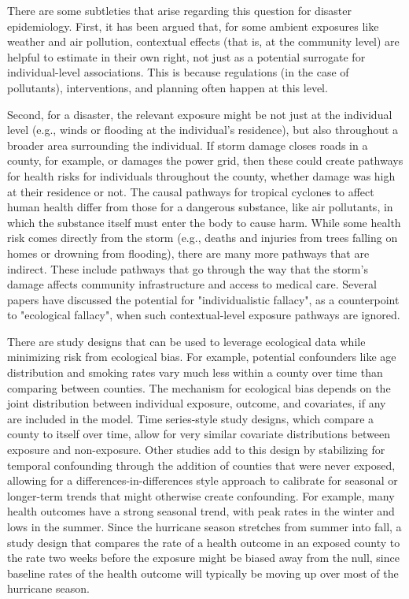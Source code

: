 There are some subtleties that arise regarding this question for disaster
epidemiology. First, it has been argued that, for some ambient exposures
like weather and air pollution, contextual effects (that is, at the community
level) are helpful to estimate in their own right, not just as a potential 
surrogate for individual-level associations. This is because regulations
(in the case of pollutants), interventions, and planning often happen at
this level. 

Second, for a disaster, the relevant exposure might be not just at the
individual level (e.g., winds or flooding at the individual's residence), but
also throughout a broader area surrounding the individual. If storm damage
closes roads in a county, for example, or damages the power grid, then these
could create pathways for health risks for individuals throughout the county,
whether damage was high at their residence or not. The causal pathways for
tropical cyclones to affect human health differ from those for a dangerous
substance, like air pollutants, in which the substance itself must enter the
body to cause harm. While some health risk comes directly from the storm (e.g.,
deaths and injuries from trees falling on homes or drowning from flooding),
there are many more pathways that are indirect. These include pathways that go
through the way that the storm's damage affects community infrastructure and
access to medical care. Several papers have discussed the potential for 
"individualistic fallacy", as a counterpoint to "ecological fallacy", when 
such contextual-level exposure pathways are ignored. 

There are study designs that can be used to leverage ecological data while
minimizing risk from ecological bias. For example, potential confounders like
age distribution and smoking rates vary much less within a county over time than
comparing between counties. The mechanism for ecological bias depends on the
joint distribution between individual exposure, outcome, and covariates, if any
are included in the model. Time series-style study designs, which compare a
county to itself over time, allow for very similar covariate distributions
between exposure and non-exposure. Other studies add to this design by
stabilizing for temporal confounding through the addition of counties that were
never exposed, allowing for a differences-in-differences style approach to
calibrate for seasonal or longer-term trends that might otherwise create
confounding. For example, many health outcomes have a strong seasonal trend,
with peak rates in the winter and lows in the summer. Since the hurricane season
stretches from summer into fall, a study design that compares the rate of a
health outcome in an exposed county to the rate two weeks before the exposure
might be biased away from the null, since baseline rates of the health outcome
will typically be moving up over most of the hurricane season.

